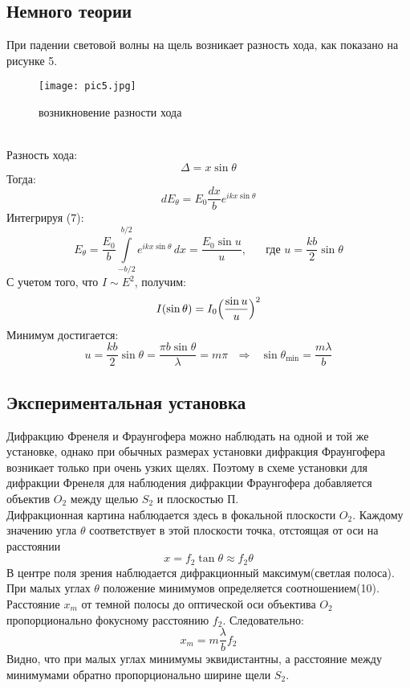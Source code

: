\documentclass[12pt]{article}
\begin{document}
	\subsection{Немного теории}
	При падении световой волны на щель возникает разность хода, как показано на рисунке 5.\\
		  \begin{figure}[h]
		\centering	
		\texttt{[image: pic5.jpg]}
		\caption{возникновение разности хода}
	\end{figure}\\
Разность хода: \[
 	\Delta = x\sin \theta
\]
Тогда: \begin{equation}
dE_{\theta} = E_0 \frac{dx}{b} e^{ikx\sin\theta}
\end{equation}
Интегрируя (7):
\begin{equation}
E_{\theta} = \frac{E_0}{b} \int\limits_{-b/2}^{b/2} e^{ikx\sin\theta} \,dx = \frac{E_0 \sin u}{u}, \mbox{ }\mbox{ }\mbox{ где } u= \frac{kb}{2}\sin \theta 
\end{equation}
С учетом того, что $I \sim E^2$, получим: \begin{equation}
I(\sin \theta) = I_0 \Bigl(\frac{\sin u}{u}\Bigl)^2
\end{equation}
Минимум достигается: \begin{equation}
u = \frac{kb}{2}\sin \theta = \frac{\pi b \sin \theta}{\lambda} = m\pi \mbox{ } \Rightarrow  \mbox{ }\sin \theta_{\min} = \frac{m\lambda}{b}
\end{equation}
\subsection{Экспериментальная установка}
	Дифракцию Френеля и Фраунгофера можно наблюдать на одной и той же установке, однако при обычных размерах установки дифракция Фраунгофера возникает только при очень узких щелях. Поэтому в схеме установки для дифракции Френеля для наблюдения дифракции Фраунгофера добавляется объектив $O_2$ между щелью $S_2$ и плоскостью П.\\
	Дифракционная картина наблюдается здесь в фокальной плоскости $O_2$. Каждому значению угла $\theta$ соответствует в этой плоскости точка, отстоящая от оси на расстоянии \begin{equation}
	x = f_2\tan \theta \approx f_2 \theta
	\end{equation}
	В центре поля зрения наблюдается дифракционный максимум(светлая полоса). При малых углах $\theta$ положение минимумов определяется соотношением(10).\\
	Расстояние $x_m$ от темной полосы до оптической оси объектива $O_2$ пропорционально фокусному расстоянию $f_2$. Следовательно: \begin{equation}
	x_m = m\frac{\lambda}{b}f_2
	\end{equation}
	Видно, что при малых углах минимумы эквидистантны, а расстояние между минимумами обратно пропорционально ширине щели $S_2$.
\end{document}
